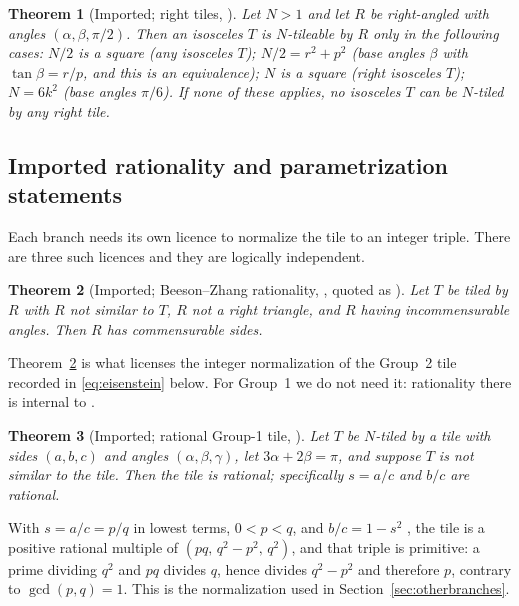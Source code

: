 \documentclass[11pt]{amsart}
\newtheorem{theorem}{Theorem}
\theoremstyle{definition}
\theoremstyle{remark}
\begin{document}
\begin{theorem}[Imported; right tiles, {\cite[Thm.~7.10]{BeesonIso}}]
\label{thm:imp-right}
Let $N>1$ and let $R$ be right-angled with angles $(\alpha,\beta,\pi/2)$.
Then an isosceles $T$ is $N$-tileable by $R$ only in the following cases:
$N/2$ is a square (any isosceles $T$); $N/2=r^2+p^2$ (base angles $\beta$
with $\tan\beta=r/p$, and this is an equivalence); $N$ is a square (right
isosceles $T$); $N=6k^2$ (base angles $\pi/6$).  If none of these applies,
no isosceles $T$ can be $N$-tiled by any right tile.
\end{theorem}

\subsection{Imported rationality and parametrization statements}
\label{sec:imports-rat}

Each branch needs its own licence to normalize the tile to an integer
triple.  There are three such licences and they are logically independent.

\begin{theorem}[Imported; Beeson--Zhang rationality,
{\cite[Thm.~1.2]{BZRat}}, quoted as {\cite[Thm.~1]{Zhang25}}]
\label{thm:imp-rat}
Let $T$ be tiled by $R$ with $R$ not similar to $T$, $R$ not a right
triangle, and $R$ having incommensurable angles.  Then $R$ has commensurable
sides.
\end{theorem}

Theorem~\ref{thm:imp-rat} is what licenses the integer normalization of the
Group~2 tile recorded in \eqref{eq:eisenstein} below.  For Group~1 we do not
need it: rationality there is internal to \cite{Beeson2229}.

\begin{theorem}[Imported; rational Group-1 tile,
{\cite[Thm.~3]{Beeson2229}}]\label{thm:imp-g1rat}
Let $T$ be $N$-tiled by a tile with sides $(a,b,c)$ and angles
$(\alpha,\beta,\gamma)$, let $3\alpha+2\beta=\pi$, and suppose $T$ is not
similar to the tile.  Then the tile is rational; specifically $s=a/c$ and
$b/c$ are rational.
\end{theorem}

With $s=a/c=p/q$ in lowest terms, $0<p<q$, and $b/c=1-s^2$
\cite[Lemma~2]{Beeson2229}, the tile is a positive rational multiple of
$(pq,\,q^2-p^2,\,q^2)$, and that triple is primitive: a prime dividing $q^2$
and $pq$ divides $q$, hence divides $q^2-p^2$ and therefore $p$, contrary to
$\gcd(p,q)=1$.  This is the normalization used in
Section~\ref{sec:otherbranches}.
\end{document}
